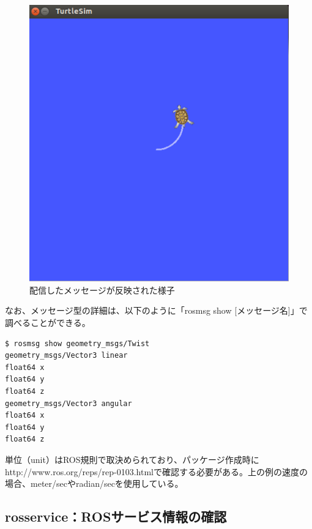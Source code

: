 \begin{figure}[htp]
  \centering
  \includegraphics[width=\columnwidth]{pictures/chapter4/pic_04_02.png}
  \caption{配信したメッセージが反映された様子}
\end{figure}

なお、メッセージ型の詳細は、以下のように「rosmsg show [メッセージ名]」で調べることができる。

\begin{lstlisting}[language=ROS]
$ rosmsg show geometry_msgs/Twist
geometry_msgs/Vector3 linear
float64 x
float64 y
float64 z
geometry_msgs/Vector3 angular
float64 x
float64 y
float64 z
\end{lstlisting}

\begin{exercise}[ROSで使用される単位]
単位（unit）はROS規則で取決められており、パッケージ作成時にhttp://www.ros.org/reps/rep-0103.htmlで確認する必要がある。上の例の速度の場合、meter/secやradian/secを使用している。
\end{exercise}


\subsection{rosservice：ROSサービス情報の確認}


